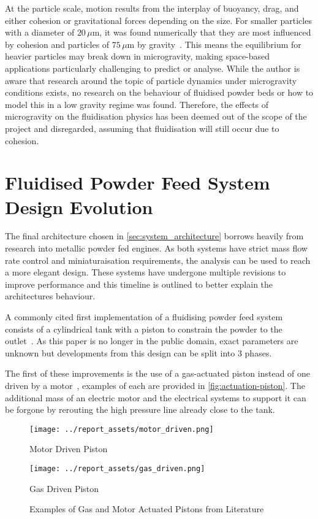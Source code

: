 At the particle scale, motion results from the interplay of buoyancy, drag, and either cohesion or gravitational forces depending on the size. For smaller particles with a diameter of $20\,\mu\mathrm{m}$, it was found numerically that they are most influenced by cohesion and particles of $75\,\mu\mathrm{m}$ by gravity~\cite{SUN201785}.  This means the equilibrium for heavier particles may break down in microgravity, making space-based applications particularly challenging to predict or analyse. While the author is aware that research around the topic of particle dynamics under microgravity conditions exists, no research on the behaviour of fluidised powder beds or how to model this in a low gravity regime was found. Therefore, the effects of microgravity on the fluidisation physics has been deemed out of the scope of the project and disregarded, assuming that fluidisation will still occur due to cohesion.

\newpage

\section{Fluidised Powder Feed System Design Evolution}\label{sec:fluidised-powder-feed-systems}
The final architecture chosen in \autoref{sec:system_architecture} borrows heavily from research into metallic powder fed engines. As both systems have strict mass flow rate control and miniaturaisation requirements, the analysis can be used to reach a more elegant design. These systems have undergone multiple revisions to improve performance and this timeline is outlined to better explain the architectures behaviour.

A commonly cited first implementation of a fluidising powder feed system consists of a cylindrical tank with a piston to constrain the powder to the outlet~\cite{LI2021712}. As this paper is no longer in the public domain, exact parameters are unknown but developments from this design can be split into 3 phases.

The first of these improvements is the use of a gas-actuated piston instead of one driven by a motor~\cite{TANG2023118406}, examples of each are provided in \autoref{fig:actuation-piston}. The additional mass of an electric motor and the electrical systems to support it can be forgone by rerouting the high pressure line already close to the tank.
\begin{figure}[htbp]
    \centering
    
    \begin{minipage}{0.35\textwidth}
        \centering
        \texttt{[image: ../report\_assets/motor\_driven.png]}
        \caption*{Motor Driven Piston~\cite{SUN201630}}
    \end{minipage}
    \hfill
    \begin{minipage}{0.55\textwidth}
        \centering
        \texttt{[image: ../report\_assets/gas\_driven.png]}
        \caption*{Gas Driven Piston~\cite{Li2016}}
    \end{minipage}
    \caption{Examples of Gas and Motor Actuated Pistons from Literature}\label{fig:actuation-piston}
\end{figure}

